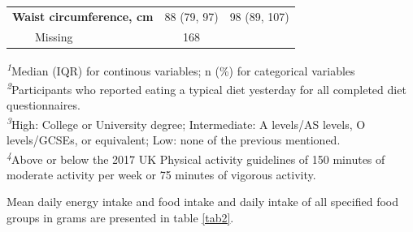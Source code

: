 \documentclass[sn-basic,Numbered,iicol,pdflatex]{sn-jnl}
\begin{document}
\begin{table}[!t]
\begin{tabular*}{1\linewidth}{@{\extracolsep{\fill}}lcc}
{\bfseries Waist circumference, cm} & 88 (79, 97) & 98 (89, 107) \\ 
    Missing & 168 &  \\ 
\bottomrule
\end{tabular*}
\begin{minipage}{\linewidth}
\textsuperscript{\textit{1}}Median (IQR) for continous variables; n (\%) for categorical variables\\
\textsuperscript{\textit{2}}Participants who reported eating a typical diet yesterday for all completed diet questionnaires.\\
\textsuperscript{\textit{3}}High: College or University degree;
Intermediate: A levels/AS levels, O levels/GCSEs, or equivalent;
Low: none of the previous mentioned.\\
\textsuperscript{\textit{4}}Above or below the 2017 UK Physical activity guidelines of 150 minutes of moderate activity per week or 75 minutes of vigorous activity.\\
\end{minipage}
\end{table}

Mean daily energy intake and food intake and daily intake of all
specified food groups in grams are presented in table \ref{tab2}.
\end{document}
